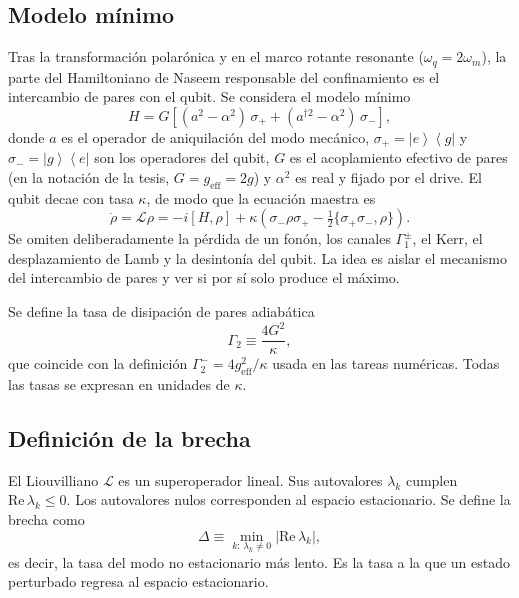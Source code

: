 \documentclass[11pt]{report}
\newcommand{\ket}[1]{\left|#1\right\rangle}
\newcommand{\bra}[1]{\left\langle#1\right|}
\newcommand{\spl}{\sigma_{+}}
\newcommand{\smi}{\sigma_{-}}
\newcommand{\GG}{\Gamma_{2}}
\newcommand{\Lv}{\mathcal{L}}
\begin{document}
\subsection{Modelo m\'inimo}

Tras la transformaci\'on polar\'onica y en el marco rotante resonante ($\omega_{q}=2\omega_{m}$), la parte del Hamiltoniano de Naseem responsable del confinamiento es el intercambio de pares con el qubit. Se considera el modelo m\'inimo
\begin{equation}
H = G\left[(a^{2}-\alpha^{2})\,\spl + (a^{\dagger 2}-\alpha^{2})\,\smi\right],
\label{eq:H}
\end{equation}
donde $a$ es el operador de aniquilaci\'on del modo mec\'anico, $\spl=\ket{e}\bra{g}$ y $\smi=\ket{g}\bra{e}$ son los operadores del qubit, $G$ es el acoplamiento efectivo de pares (en la notaci\'on de la tesis, $G=g_{\mathrm{eff}}=2g$) y $\alpha^{2}$ es real y fijado por el drive. El qubit decae con tasa $\kappa$, de modo que la ecuaci\'on maestra es
\begin{equation}
\dot\rho = \Lv\rho = -i[H,\rho] + \kappa\left(\smi\rho\spl - \tfrac{1}{2}\{\spl\smi,\rho\}\right).
\label{eq:ME}
\end{equation}
Se omiten deliberadamente la p\'erdida de un fon\'on, los canales $\Gamma_{1}^{\pm}$, el Kerr, el desplazamiento de Lamb y la desinton\'ia del qubit. La idea es aislar el mecanismo del intercambio de pares y ver si por s\'i solo produce el m\'aximo.

Se define la tasa de disipaci\'on de pares adiab\'atica
\begin{equation}
\GG \equiv \frac{4G^{2}}{\kappa},
\label{eq:G2}
\end{equation}
que coincide con la definici\'on $\Gamma_{2}^{-}=4g_{\mathrm{eff}}^{2}/\kappa$ usada en las tareas num\'ericas. Todas las tasas se expresan en unidades de $\kappa$.

\subsection{Definici\'on de la brecha}

El Liouvilliano $\Lv$ es un superoperador lineal. Sus autovalores $\lambda_{k}$ cumplen $\mathrm{Re}\,\lambda_{k}\leq 0$. Los autovalores nulos corresponden al espacio estacionario. Se define la brecha como
\begin{equation}
\Delta \equiv \min_{k:\,\lambda_{k}\neq 0}\left|\mathrm{Re}\,\lambda_{k}\right|,
\end{equation}
es decir, la tasa del modo no estacionario m\'as lento. Es la tasa a la que un estado perturbado regresa al espacio estacionario.
\end{document}
